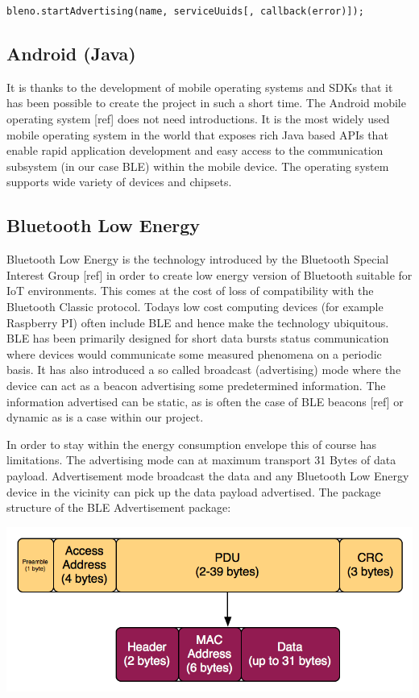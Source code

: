 \smallskip
{\tt bleno.startAdvertising(name, serviceUuids[, callback(error)]);}
\newline
\smallskip

\subsection{Android (Java)}
\label{subsec:android}
It is thanks to the development of mobile operating systems and SDKs that it has been possible to create the project in such a short time. The Android mobile operating system [ref] does not need introductions. It is the most widely used mobile operating system in the world that exposes rich Java based APIs that enable rapid application development and easy access to the communication subsystem (in our case BLE) within the mobile device. The operating system supports wide variety of devices and chipsets.


\subsection{Bluetooth Low Energy}
\label{subsec:bluetooth}
Bluetooth Low Energy is the technology introduced by the Bluetooth Special Interest Group [ref] in order to create low energy version of Bluetooth suitable for IoT environments. This comes at the cost of loss of compatibility with the Bluetooth Classic protocol. Todays low cost computing devices (for example Raspberry PI) often include BLE and hence make the technology ubiquitous. BLE has been primarily designed for short data bursts status communication where devices would communicate some measured phenomena on a periodic basis. It has also introduced a so called broadcast (advertising) mode where the device can act as a beacon advertising some predetermined information. The information advertised can be static, as is often the case of BLE beacons [ref] or dynamic as is a case within our project. 

\bigskip

In order to stay within the energy consumption envelope this of course has limitations. The advertising mode can at maximum transport 31 Bytes of data payload. Advertisement mode broadcast the data and any Bluetooth Low Energy device in the vicinity can pick up the data payload advertised. The package structure of the BLE Advertisement package:

\bigskip
\includegraphics[scale=0.4]{gfx/blepacket} 
\bigskip  

